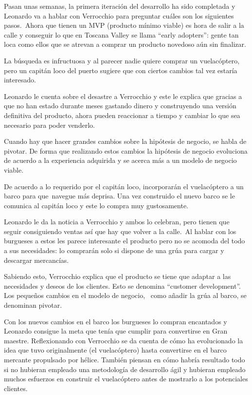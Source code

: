 {
Pasan unas semanas, la primera iteraci\'on del desarrollo ha sido completada y Leonardo va a hablar con Verrocchio para
preguntar cu\'ales son los siguientes pasos.\ Ahora que tienen un MVP (producto m\'inimo viable) es hora de salir a la
calle y conseguir lo que en Toscana Valley se llama ``early adopters'': gente tan loca como ellos que se atrevan a
comprar un producto novedoso a\'un sin finalizar.}

{
La b\'usqueda es infructuosa y al parecer nadie quiere comprar un vuelac\'optero, pero un capit\'an loco del puerto
sugiere que con ciertos cambios tal vez estar\'ia interesado.}

{
Leonardo le cuenta sobre el desastre a Verrocchio y este le explica que gracias a que no han estado durante meses
gastando dinero y construyendo una versi\'on definitiva del producto, ahora pueden reaccionar a tiempo y cambiar lo que
sea necesario para poder venderlo.}

{
Cuando hay que hacer grandes cambios sobre la hip\'otesis de negocio, se habla de pivotar. De forma que realizando estos
cambios la hip\'otesis de negocio evoluciona de acuerdo a la experiencia adquirida y se acerca m\'as a un modelo de
negocio viable.}

{
De acuerdo a lo requerido por el capit\'an loco, incorporar\'an el vuelac\'optero a un barco para que\ navegue m\'as
deprisa. Una vez construido el nuevo barco se le comunica al capit\'an loco y este lo compra muy gustosamente.}

{
Leonardo le da la noticia a Verrocchio y ambos lo celebran, pero tienen que seguir consiguiendo ventas as\'i que hay que
volver a la calle.\ Al hablar con los burgueses a estos les parece interesante el producto pero no se acomoda del todo
a sus necesidades: lo comprar\'an solo si dispone de una gr\'ua para cargar y descargar mercanc\'ias.}

{
Sabiendo esto, Verrocchio explica que el producto se tiene que adaptar a las necesidades y deseos de los clientes. Esto
se denomina ``customer development''. Los peque\~nos cambios en el modelo de negocio, \ como a\~nadir la gr\'ua al
barco, se denominan pivotar.}

{
Con los nuevos cambios en el barco los burgueses lo compran encantados y Leonardo consigue la meta que ten\'ia que
cumplir para convertirse en Gran maestre. Reflexionando con Verrocchio se da cuenta de c\'omo ha evolucionado la idea
que tuvo originalmente (el vuelac\'optero) hasta convertirse en el barco mercante propulsado por h\'elice. Tambi\'en
piensan en c\'omo habr\'ia resultado todo si no hubieran empleado una metodolog\'ia de desarrollo \'agil y hubieran
empleado muchos esfuerzos en construir el vuelac\'optero antes de mostrarlo a los potenciales clientes.\ }


